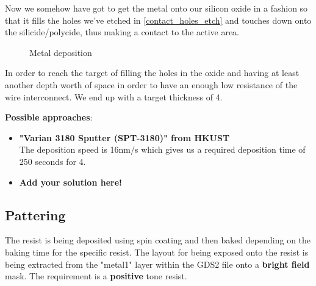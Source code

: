 Now we somehow have got to get the metal onto our silicon oxide in a fashion so that it fills the holes we've etched in \autoref{contact_holes_etch} and touches down onto the silicide/polycide, thus making a contact to the active area.

\begin{figure}[H]
	\centering
	\begin{tikzpicture}[node distance = 3cm, auto, thick,scale=\CrossSectionOnly, every node/.style={transform shape}]
		
	\end{tikzpicture}
	\drawStepArrow{}
	\begin{tikzpicture}[node distance = 3cm, auto, thick,scale=\CrossSectionOnly, every node/.style={transform shape}]
		
	\end{tikzpicture}
	\caption{Metal deposition}
\end{figure}

In order to reach the target of filling the holes in the oxide and having at least another depth worth of space in order to have an enough low resistance of the wire interconnect.
We end up with a target thickness of 4\um.

\textbf{Possible approaches}:
\begin{itemize}
	\item \textbf{"Varian 3180 Sputter (SPT-3180)" from HKUST} \\
	The deposition speed is 16nm/s which gives us a required deposition time of 250 seconds for 4\um.
	\item \textbf{Add your solution here!}
\end{itemize}

\subsection{Pattering}
The resist is being deposited using spin coating and then baked depending on the baking time for the specific resist.
The layout for being exposed onto the resist is being extracted from the "metal1" layer within the GDS2 file onto a \textbf{bright field} mask.
The requirement is a \textbf{positive} tone resist.

